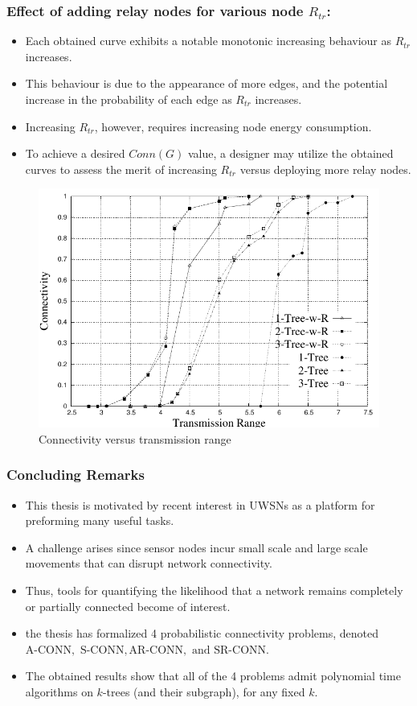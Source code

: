 \documentclass{beamer}
\newcommand{\ACONN}   { {\mathrm {A\mbox{-}CONN}} }
\newcommand{\SCONN}   { {\mathrm {S\mbox{-}CONN}} }
\newcommand{\ARCONN}   { {\mathrm {AR\mbox{-}CONN}} }
\newcommand{\SRCONN}   { {\mathrm {SR\mbox{-}CONN}} }
\begin{document}
\begin{frame}
\frametitle{Effect of adding relay nodes for various node $R_{tr}$:}
\begin{itemize}
\item Each obtained curve exhibits a notable monotonic increasing behaviour as $R_{tr}$ increases. 
\item This behaviour is due to the appearance of more edges, and the potential increase in the probability of each edge as $R_{tr}$ increases. 
\item Increasing $R_{tr}$, however, requires increasing node energy consumption.
\item  To achieve a desired $Conn(G)$ value, a designer may utilize the obtained curves to assess the merit of increasing $R_{tr}$ versus deploying more relay nodes.
\end{itemize}
\begin{figure}[!htb]
\begin{minipage}{.9\linewidth}
\end{minipage}
\includegraphics[width=4 in, height=1.35 in]{NetworkI_woR-eps-converted-to.pdf}
\caption{Connectivity versus transmission range}
\label{Fig:NWOR}
\end{figure}

\end{frame}

\begin{frame}
\frametitle{Concluding Remarks}
\begin{itemize}
\item This thesis is motivated by recent interest in UWSNs as a platform for preforming many useful tasks. 
\item A challenge arises since sensor nodes incur small scale and large scale movements that can disrupt network connectivity.
\item  Thus, tools for quantifying the likelihood that a network remains completely or partially connected become of interest.

\item the thesis has formalized 4 probabilistic connectivity problems, denoted $\ACONN,$ $ \SCONN, \ARCONN, \mbox{ and } \SRCONN$. 
\item The obtained results show that all of the 4 problems admit polynomial time algorithms on $k$-trees (and their subgraph), for any fixed $k$.
\end{itemize}
\end{frame}
\end{document}
